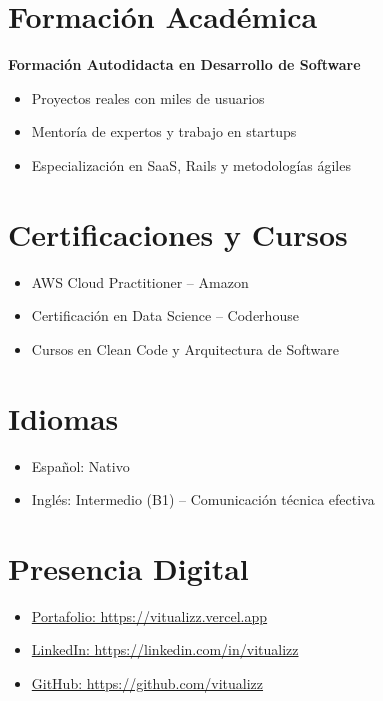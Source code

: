 \documentclass[10pt]{article}
\begin{document}
\section{Formación Académica}
\textbf{Formación Autodidacta en Desarrollo de Software}
\begin{itemize}
  \item Proyectos reales con miles de usuarios
  \item Mentoría de expertos y trabajo en startups
  \item Especialización en SaaS, Rails y metodologías ágiles
\end{itemize}


\vspace{1.5em}
\section{Certificaciones y Cursos}
\begin{itemize}
  \item AWS Cloud Practitioner – Amazon
  \item Certificación en Data Science – Coderhouse
  \item Cursos en Clean Code y Arquitectura de Software
\end{itemize}


\vspace{1.5em}
\section{Idiomas}
\begin{itemize}
  \item Español: Nativo
  \item Inglés: Intermedio (B1) – Comunicación técnica efectiva
\end{itemize}


\vspace{1.5em}
\section{Presencia Digital}
\begin{itemize}
  \item \href{https://vitualizz.vercel.app/}{Portafolio: https://vitualizz.vercel.app}
  \item \href{https://www.linkedin.com/in/vitualizz}{LinkedIn: https://linkedin.com/in/vitualizz}
  \item \href{https://github.com/vitualizz}{GitHub: https://github.com/vitualizz}
\end{itemize}
\end{document}
